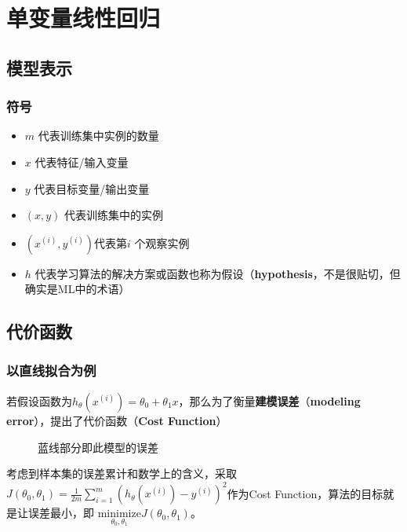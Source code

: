 \documentclass[../main.tex]{subfiles}
\begin{document}
\chapter{单变量线性回归}
\section{模型表示}
\subsection{符号}
\begin{itemize}
    \item \(m\) 代表训练集中实例的数量
    \item \(x\) 代表特征/输入变量
    \item \(y\) 代表目标变量/输出变量
    \item \((x,y)\) 代表训练集中的实例
    \item \(({{x}^{(i)}},{{y}^{(i)}})\)代表第\(i\) 个观察实例
    \item \(h\) 代表学习算法的解决方案或函数也称为假设（\textbf{hypothesis}，不是很贴切，但确实是ML中的术语）
\end{itemize}


\section{代价函数}
\subsection{以直线拟合为例}
若假设函数为\(h_θ(x^{(i)}) = θ_0+θ_1x\)，那么为了衡量\textbf{建模误差}（\textbf{modeling error}），提出了代价函数（\textbf{Cost Function}）

\begin{figure}[H]
    \centering
    \caption{蓝线部分即此模型的误差}
\end{figure}
考虑到样本集的误差累计和数学上的含义，采取 \(J(θ_0,θ_1) = \frac{1}{2m}\sum\limits_{i=1}^m ( h_{θ}(x^{(i)})-y^{(i)} )^{2}\)作为Cost Function，算法的目标就是让误差最小，即 \(\underset{θ_0, θ_1}{\text{minimize}} J(θ_0, θ_1)\)。
\end{document}
